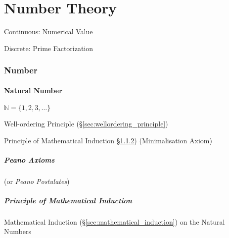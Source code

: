 \part{Number Theory}\label{sec:number_theory}


Continuous: Numerical Value

Discrete: Prime Factorization



\section{Number}\label{sec:number}

\subsection{Natural Number}\label{sec:natural_number}

$\mathbb{N} = \{ 1,2,3,\ldots \}$

Well-ordering Principle (\S\ref{sec:wellordering_principle})

Principle of Mathematical Induction \S\ref{sec:induction_principle})
(Minimalisation Axiom)



\subsubsection{Peano Axioms}\label{sec:peano_axioms}

(or \emph{Peano Postulates})



\subsubsection{Principle of Mathematical Induction}
\label{sec:induction_principle}

Mathematical Induction (\S\ref{sec:mathematical_induction}) on the
Natural Numbers



